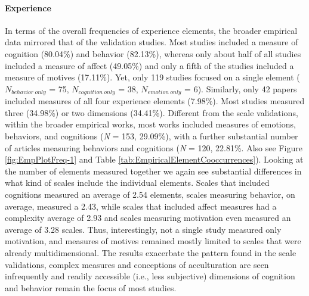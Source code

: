 \paragraph{Experience}

In terms of the overall frequencies of experience elements, the broader
empirical data mirrored that of the validation studies. Most studies
included a measure of cognition (80.04\%) and behavior (82.13\%),
whereas only about half of all studies included a measure of affect
(49.05\%) and only a fifth of the studies included a measure of motives
(17.11\%). Yet, only 119 studies focused on a single element
(\(N_{behavior\ only}\) = 75, \(N_{cognition\ only}\) = 38,
\(N_{emotion\ only}\) = 6). Similarly, only 42 papers included measures
of all four experience elements (7.98\%). Most studies measured three
(34.98\%) or two dimensions (34.41\%). Different from the scale
validations, within the broader empirical works, most works included
measures of emotions, behaviors, and cognitions (\textit{N} = 153,
29.09\%), with a further substantial number of articles measuring
behaviors and cognitions (\textit{N} = 120, 22.81\%. Also see Figure
\ref{fig:EmpPlotFreq-1} and Table
\ref{tab:EmpiricalElementCooccurrences}). Looking at the number of
elements measured together we again see substantial differences in what
kind of scales include the individual elements. Scales that included
cognitions measured an average of 2.54 elements, scales measuring
behavior, on average, measured a 2.43, while scales that included affect
measures had a complexity average of 2.93 and scales measuring
motivation even measured an average of 3.28 scales. Thus, interestingly,
not a single study measured only motivation, and measures of motives
remained mostly limited to scales that were already multidimensional.
The results exacerbate the pattern found in the scale validations,
complex measures and conceptions of acculturation are seen infrequently
and readily accessible (i.e., less subjective) dimensions of cognition
and behavior remain the focus of most studies.

